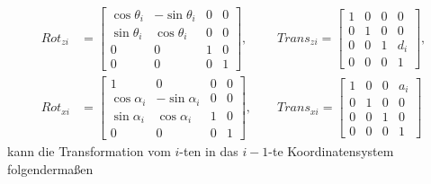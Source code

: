 \begin{align}
Rot_{zi} &= 
\begin{bmatrix}
	\cos\theta_i & -\sin\theta_i & 0 & 0 \\
	\sin\theta_i & \cos\theta_i  & 0 & 0 \\
	0            & 0             & 1 & 0 \\
	0            & 0             & 0 & 1 
\end{bmatrix}
, 
\qquad \, \, Trans_{zi} = 
\begin{bmatrix}
	1            & 0             & 0 & 0 \\
	0            & 1             & 0 & 0 \\
	0            & 0             & 1 & d_i \\
	0            & 0             & 0 & 1 
\end{bmatrix}, \\
Rot_{xi} &= 
\begin{bmatrix}
1             & 0             & 0 & 0 \\
\cos\alpha_i  & -\sin\alpha_i & 0 & 0 \\
\sin\alpha_i  & \cos\alpha_i  & 1 & 0 \\
0             & 0             & 0 & 1 
\end{bmatrix},
\qquad Trans_{xi} = 
\begin{bmatrix}
1            & 0             & 0 & a_i \\
0            & 1             & 0 & 0 \\
0            & 0             & 1 & 0 \\
0            & 0             & 0 & 1 
\end{bmatrix} 
\end{align}
kann die Transformation vom $i$-ten in das $i-1$-te Koordinatensystem folgendermaßen 

